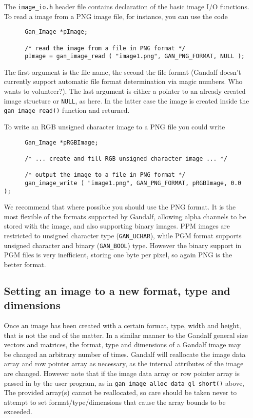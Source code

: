 The {\tt image\_io.h} header file contains declaration of the basic
image I/O functions. To read a image from a PNG image file, for instance,
you can use the code
\begin{verbatim}
      Gan_Image *pImage;

      /* read the image from a file in PNG format */
      pImage = gan_image_read ( "image1.png", GAN_PNG_FORMAT, NULL );
\end{verbatim}
The first argument is the file name, the second the file format (Gandalf
doesn't currently support automatic file format determination via magic
numbers. Who wants to volunteer?). The last argument is either a pointer
to an already created image structure or {\tt NULL}, as here. In the latter
case the image is created inside the {\tt gan\_image\_read()} function
and returned.

To write an RGB unsigned character image to a PNG file you could write
\begin{verbatim}
      Gan_Image *pRGBImage;

      /* ... create and fill RGB unsigned character image ... */

      /* output the image to a file in PNG format */
      gan_image_write ( "image1.png", GAN_PNG_FORMAT, pRGBImage, 0.0 );
\end{verbatim}
We recommend that where possible you should use the PNG format. It is the
most flexible of the formats supported by Gandalf, allowing alpha channels
to be stored with the image, and also supporting binary images. PPM images
are restricted to unsigned character type ({\tt GAN\_UCHAR}), while
PGM format supports unsigned character and binary ({\tt GAN\_BOOL}) type.
However the binary support in PGM files is very inefficient, storing
one byte per pixel, so again PNG is the better format.

\subsection{Setting an image to a new format, type and dimensions}
Once an image has been created with a certain format, type, width and height,
that is not the end of the matter. In a similar manner to the Gandalf
general size vectors and matrices, the format, type and dimensions of a
Gandalf image may be changed an arbitrary number of times. Gandalf will
reallocate the image data array and row pointer array as necessary,
as the internal attributes of the image are changed. However note that
if the image data array or row pointer array is passed in by the
user program, as in {\tt gan\_image\_alloc\_data\_gl\_short()} above,
The provided array(s) cannot be reallocated, so care should be taken
never to attempt to set format/type/dimensions that cause the array bounds
to be exceeded.

